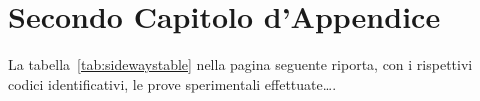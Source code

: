 %
%
\chapter{Secondo Capitolo d'Appendice}
%
\label{cap:appendice2}
%
%
\lipsum[1-2]
%

\medskip
La tabella~\ref{tab:sidewaystable} nella pagina seguente riporta, con i rispettivi codici identificativi, le prove sperimentali effettuate\dots.
%
%
